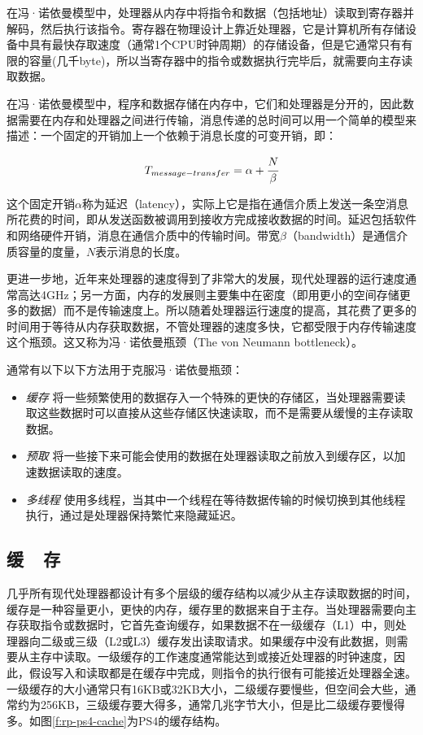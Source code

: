 在冯·诺依曼模型中，处理器从内存中将指令和数据（包括地址）读取到寄存器并解码，然后执行该指令。寄存器在物理设计上靠近处理器，它是计算机所有存储设备中具有最快存取速度（通常1个CPU时钟周期）的存储设备，但是它通常只有有限的容量(几千byte)，所以当寄存器中的指令或数据执行完毕后，就需要向主存读取数据。

在冯·诺依曼模型中，程序和数据存储在内存中，它们和处理器是分开的，因此数据需要在内存和处理器之间进行传输，消息传递的总时间可以用一个简单的模型来描述：一个固定的开销加上一个依赖于消息长度的可变开销，即：

\begin{equation}
	T_{message-transfer}=\alpha+ \cfrac{N}{\beta}
\end{equation}


\noindent 这个固定开销$\alpha$称为延迟（latency），实际上它是指在通信介质上发送一条空消息所花费的时间，即从发送函数被调用到接收方完成接收数据的时间。延迟包括软件和网络硬件开销，消息在通信介质中的传输时间。带宽$\beta$（bandwidth）是通信介质容量的度量，$N$表示消息的长度。

更进一步地，近年来处理器的速度得到了非常大的发展，现代处理器的运行速度通常高达4GHz；另一方面，内存的发展则主要集中在密度（即用更小的空间存储更多的数据）而不是传输速度上。所以随着处理器运行速度的提高，其花费了更多的时间用于等待从内存获取数据，不管处理器的速度多快，它都受限于内存传输速度这个瓶颈。这又称为冯·诺依曼瓶颈（The von Neumann bottleneck）。

通常有以下以下方法用于克服冯·诺依曼瓶颈：

\begin{itemize}
	\item \emph{缓存 } 将一些频繁使用的数据存入一个特殊的更快的存储区，当处理器需要读取这些数据时可以直接从这些存储区快速读取，而不是需要从缓慢的主存读取数据。
	\item \emph{预取 } 将一些接下来可能会使用的数据在处理器读取之前放入到缓存区，以加速数据读取的速度。
	\item \emph{多线程 } 使用多线程，当其中一个线程在等待数据传输的时候切换到其他线程执行，通过是处理器保持繁忙来隐藏延迟。
\end{itemize}




\subsection{缓~~存}
几乎所有现代处理器都设计有多个层级的缓存结构以减少从主存读取数据的时间，缓存是一种容量更小，更快的内存，缓存里的数据来自于主存。当处理器需要向主存获取指令或数据时，它首先查询缓存，如果数据不在一级缓存（L1）中，则处理器向二级或三级（L2或L3）缓存发出读取请求。如果缓存中没有此数据，则需要从主存中读取。一级缓存的工作速度通常能达到或接近处理器的时钟速度，因此，假设写入和读取都是在缓存中完成，则指令的执行很有可能接近处理器全速。一级缓存的大小通常只有16KB或32KB大小，二级缓存要慢些，但空间会大些，通常约为256KB，三级缓存要大得多，通常几兆字节大小，但是比二级缓存要慢得多。如图\ref{f:rp-ps4-cache}为PS4的缓存结构。

